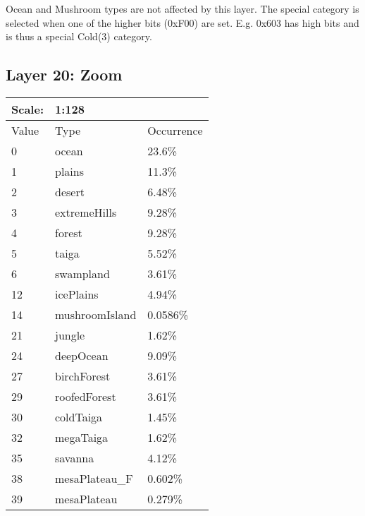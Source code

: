 \documentclass{article}
\begin{document}
	\medskip\noindent
	Ocean and Mushroom types are not affected by this layer. The special category is selected when one of the higher bits (0xF00) are set. E.g. 0x603 has high bits and is thus a special Cold(3) category.
	
	
	\subsection{Layer 20: Zoom}
	\begin{tabular}{|l|l|l|}\hline
		Scale: & \multicolumn{2}{|l|}{1:128} \\\hline\hline
		Value  & Type           & Occurrence \\\hline
		0      & ocean          & 23.6\%\\\hline
		1      & plains         & 11.3\%\\\hline
		2      & desert         & 6.48\%\\\hline
		3      & extremeHills   & 9.28\%\\\hline
		4      & forest         & 9.28\%\\\hline
		5      & taiga          & 5.52\%\\\hline
		6      & swampland      & 3.61\%\\\hline
		12     & icePlains      & 4.94\%\\\hline
		14     & mushroomIsland & 0.0586\%\\\hline
		21     & jungle         & 1.62\%\\\hline
		24     & deepOcean      & 9.09\%\\\hline
		27     & birchForest    & 3.61\%\\\hline
		29     & roofedForest   & 3.61\%\\\hline
		30     & coldTaiga      & 1.45\%\\\hline
		32     & megaTaiga      & 1.62\%\\\hline
		35     & savanna        & 4.12\%\\\hline
		38     & mesaPlateau\_F & 0.602\%\\\hline
		39     & mesaPlateau    & 0.279\%\\\hline
	\end{tabular}

	
\end{document}
